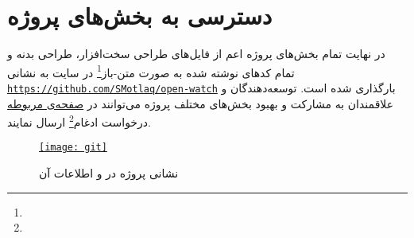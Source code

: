 \section{دسترسی به بخش‌های پروژه}
در نهایت تمام بخش‌های پروژه اعم از فایل‌های طراحی سخت‌افزار، طراحی بدنه و تمام کدهای نوشته شده به صورت متن-باز\footnote{}
در سایت  به نشانی
\href{http://smotlaq.ir/IPyEt}{\texttt{https://github.com/SMotlaq/open-watch}}
بارگذاری شده است. توسعه‌دهندگان و علاقمندان به مشارکت و بهبود بخش‌های مختلف پروژه می‌توانند در
\href{http://smotlaq.ir/IPyEt}{صفحه‌ی مربوطه}
درخواست ادغام\footnote{}
ارسال نمایند.

\begin{figure}[h]
	\centering
	\href{http://smotlaq.ir/IPyEt}{\texttt{[image: git]}}
	\caption{نشانی پروژه در  و اطلاعات آن}
	\label{fig:git}
\end{figure}
